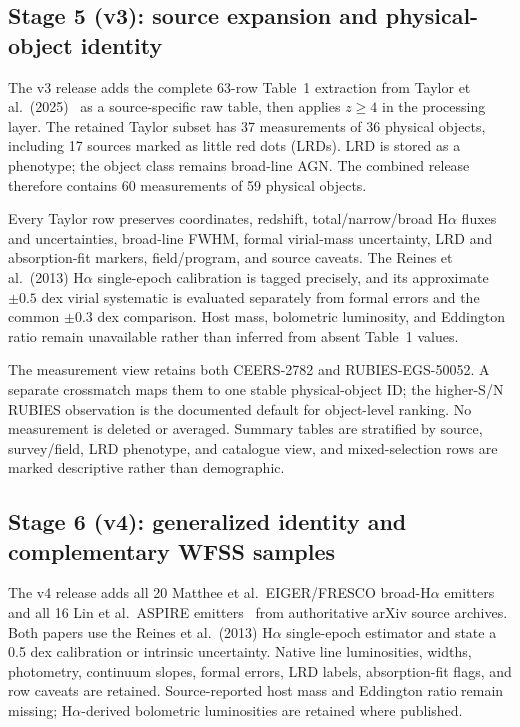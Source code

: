 \documentclass[11pt]{article}
\begin{document}
\subsection{Stage 5 (v3): source expansion and physical-object identity}

The v3 release adds the complete 63-row Table~1 extraction from Taylor et al.\ (2025)~\cite{taylor2025} as a source-specific raw table, then applies $z\geq4$ in the processing layer. The retained Taylor subset has 37 measurements of 36 physical objects, including 17 sources marked as little red dots (LRDs). LRD is stored as a phenotype; the object class remains broad-line AGN. The combined release therefore contains 60 measurements of 59 physical objects.

Every Taylor row preserves coordinates, redshift, total/narrow/broad H$\alpha$ fluxes and uncertainties, broad-line FWHM, formal virial-mass uncertainty, LRD and absorption-fit markers, field/program, and source caveats. The Reines et al.\ (2013) H$\alpha$ single-epoch calibration is tagged precisely, and its approximate $\pm0.5$ dex virial systematic is evaluated separately from formal errors and the common $\pm0.3$ dex comparison. Host mass, bolometric luminosity, and Eddington ratio remain unavailable rather than inferred from absent Table~1 values.

The measurement view retains both CEERS-2782 and RUBIES-EGS-50052. A separate crossmatch maps them to one stable physical-object ID; the higher-S/N RUBIES observation is the documented default for object-level ranking. No measurement is deleted or averaged. Summary tables are stratified by source, survey/field, LRD phenotype, and catalogue view, and mixed-selection rows are marked descriptive rather than demographic.

\subsection{Stage 6 (v4): generalized identity and complementary WFSS samples}

The v4 release adds all 20 Matthee et al.\ EIGER/FRESCO broad-H$\alpha$ emitters~\cite{matthee2024} and all 16 Lin et al.\ ASPIRE emitters~\cite{lin2024} from authoritative arXiv source archives. Both papers use the Reines et al.\ (2013) H$\alpha$ single-epoch estimator and state a 0.5 dex calibration or intrinsic uncertainty. Native line luminosities, widths, photometry, continuum slopes, formal errors, LRD labels, absorption-fit flags, and row caveats are retained. Source-reported host mass and Eddington ratio remain missing; H$\alpha$-derived bolometric luminosities are retained where published.
\end{document}

